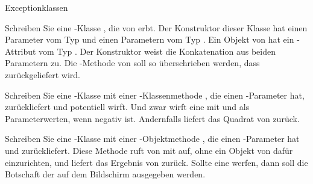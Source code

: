 \documentclass{../tuda-exercise}
\begin{document}
  \clearpage

  \begin{task}[credit=\stars{2}{3}]{Exceptionklassen}
    \begin{subtask}
      Schreiben Sie eine -Klasse , die von
       erbt. Der Konstruktor dieser Klasse hat einen Parameter
       vom Typ  und einen Parametern vom Typ .
      Ein Objekt von  hat ein -Attribut
       vom Typ . Der Konstruktor weist
       die Konkatenation aus beiden Parametern zu. Die
      -Methode  von  soll so
      überschrieben werden, dass  zurückgeliefert wird.

      \begin{solution}
        
      \end{solution}
    \end{subtask}

    \begin{subtask}
      Schreiben Sie eine -Klasse  mit einer
      -Klassenmethode , die einen -Parameter
       hat,  zurückliefert und potentiell 
      wirft. Und zwar wirft  eine  mit
      \code{\textcolor{stringcolor}{"'n cannot be negative"'}} und  als
      Parameterwerten, wenn negativ ist. Andernfalls liefert  das Quadrat von
       zurück.

      \begin{solution}
        
      \end{solution}
    \end{subtask}

    \begin{subtask}
      Schreiben Sie eine -Klasse  mit einer
      -Objektmethode , die einen -Parameter
       hat und  zurückliefert.
      Diese Methode ruft  von  mit  auf, ohne ein Objekt von
       dafür einzurichten, und liefert das Ergebnis von  zurück.
      Sollte  eine  werfen, dann soll die Botschaft der
       auf dem Bildschirm ausgegeben werden.

      \begin{solution}
        
      \end{solution}
    \end{subtask}
  \end{task}
\end{document}
